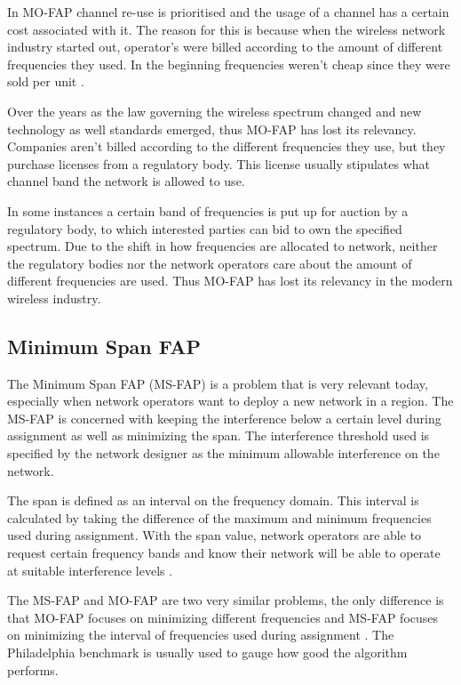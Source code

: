 In MO-FAP channel re-use is prioritised and the usage of a channel has a certain cost associated with it. The reason for this is because when the wireless network industry started out, operator's were billed according to the amount of different frequencies they used. In the beginning frequencies weren't cheap since they were sold per unit \cite{Karen2004,MontemanniThesis}. 

Over the years as the law governing the wireless spectrum changed and new technology as well standards emerged, thus MO-FAP has lost its relevancy\cite{Karen2004,MontemanniThesis}. Companies aren't billed according to the different frequencies they use, but they purchase licenses from a regulatory body\cite{Karen2004,MontemanniThesis}. This license usually stipulates what channel band the network is allowed to use.

In some instances a certain band of frequencies is put up for auction by a regulatory body, to which interested parties can bid to own the specified spectrum\cite{Karen2004,MontemanniThesis}. Due to the shift in how frequencies are allocated to network, neither the regulatory bodies nor the network operators care about the amount of different frequencies are used\cite{Karen2004,MontemanniThesis}. Thus MO-FAP has lost its relevancy in the modern wireless industry.
\subsection{Minimum Span FAP}
The Minimum Span FAP (MS-FAP) is a problem that is very relevant today, especially when network operators want to deploy a new network in a region\cite{Karen2004}. The MS-FAP is concerned with keeping the interference below a certain level during assignment as well as minimizing the span. The interference threshold used is specified by the network designer as the minimum allowable interference on the network\cite{Karen2004,MontemanniThesis,MSFAP}.

The span is defined as an interval on the frequency domain. This interval is calculated by taking the difference of the maximum and minimum frequencies used during assignment\cite{Karen2004,MontemanniThesis,MSFAP}. With the span value, network operators are able to request certain frequency bands and know their network will be able to operate at suitable interference levels \cite{Karen2004,MontemanniThesis,MSFAP}.

The MS-FAP and MO-FAP are two very similar problems, the only difference is that MO-FAP focuses on minimizing different frequencies and MS-FAP focuses on minimizing the interval of frequencies used during assignment \cite{Karen2004}. The Philadelphia benchmark is usually used to gauge how good the algorithm performs.
